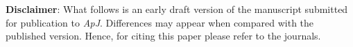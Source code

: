 \documentclass[../../main/thesis_msc.tex]{subfiles}
\begin{document}
		\vspace{15cm}
		\noindent \textbf{Disclaimer}: What follows is an early draft version of the manuscript submitted for publication to \textit{ApJ}. Differences may appear when compared with the published version. Hence, for citing this paper please refer to the journals.

\newpage

     
     
	

	
\end{document}
